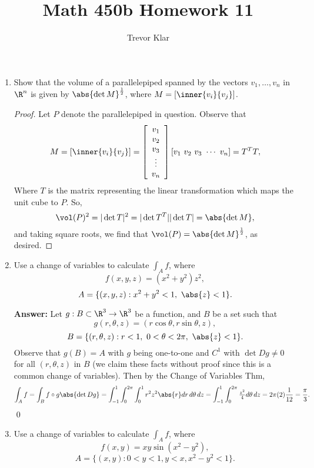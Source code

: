 \documentclass[letterpaper]{article}
\title{Math 450b \linebreak
Homework 11}
\author{Trevor Klar}
\begin{document}
\maketitle

\begin{enumerate}
\item Show that the volume of a parallelepiped spanned by the vectors $v_1, \dots, v_n$ in $\R^n$ is given by $\abs{\det M}^{\frac{1}{2}}$, where $M= [\inner{v_i}{v_j}]$.
\begin{proof}
Let $P$ denote the parallelepiped in question. Observe that 
\[M= [\inner{v_i}{v_j}] = 
\left[
\begin{array}{c}
v_1\\
v_2\\
v_3\\
\vdots\\
v_n\\
\end{array}
\right]
\left[v_1\,\, v_2\,\, v_3\,\, \cdots\,\, v_n\right]
=T^T T,\]
Where $T$ is the matrix representing the linear transformation which maps the unit cube to $P$. So,
$$\vol(P)^2=|\det T|^2=|\det T^T||\det T|=\abs{\det M},$$
and taking square roots, we find that $\vol(P)=\abs{\det M}^\frac{1}{2}$, as desired. 
\end{proof} 

\item Use a change of variables to calculate $\int_A f$, where 
$$f(x,y,z) = (x^2+y^2)z^2,$$
$$A=\{(x,y,z):x^2+y^2<1, \,\, \abs{z}<1\}.$$

\textbf{Answer:} Let $g:B\subset\R^3\to\R^3$ be a function, and $B$ be a set such that 
$$g(r,\theta, z)=(r\cos\theta, r\sin\theta, z),$$
$$B=\{(r,\theta, z):r<1, \,\,0<\theta<2\pi, \,\,\abs{z}<1\}.$$ Observe that $g(B)=A$ with $g$ being one-to-one and $C^1$ with $\det Dg\neq0$ for all $(r,\theta, z)$ in $B$ (we claim these facts without proof since this is a common change of variables). Then by the Change of Variables Thm, 
$$\int_A f=\int_B f\circ g \abs{\det Dg}
=\int_{-1}^1 \int_0^{2\pi} \int_0^1 r^2 z^2 \abs{r} dr \, d\theta \, dz =\int_{-1}^1 \int_0^{2\pi} \tfrac{z^2}{4} d\theta \, dz=2\pi(2)\frac{1}{12}=\frac{\pi}{3}.$$\qed

\pagebreak
\item Use a change of variables to calculate $\int_A f$, where 
$$f(x,y)=xy\sin (x^2-y^2),$$ 
$$A=\{(x,y):0<y<1, y<x, x^2-y^2<1\}.$$


\end{enumerate}
\end{document}
